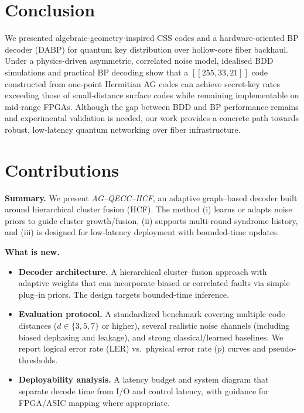 \documentclass[conference]{IEEEtran}
\begin{document}
    \section{Conclusion}

    We presented algebraic‑geometry‑inspired CSS codes and a hardware‑oriented BP decoder (DABP) for quantum key 
distribution over hollow‑core fiber backhaul.  Under a physics‑driven asymmetric, correlated noise model, idealised BDD 
simulations and practical BP decoding show that a $[[255,33,21]]$ code constructed from one‑point Hermitian AG codes can
  achieve secret‑key rates exceeding those of small‑distance surface codes while remaining implementable on mid‑range 
FPGAs.  Although the gap between BDD and BP performance remains and experimental validation is needed, our work provides
  a concrete path towards robust, low‑latency quantum networking over fiber infrastructure.


    \clearpage
    \section{Contributions}
    \label{sec:contributions}
    \noindent\textbf{Summary.} We present \emph{AG--QECC--HCF}, an adaptive graph--based decoder built around 
hierarchical cluster fusion (HCF). The method (i) learns or adapts noise priors to guide cluster growth/fusion, (ii) 
supports multi-round syndrome history, and (iii) is designed for low-latency deployment with bounded-time updates.

    \vspace{0.35em}
    \noindent\textbf{What is new.}
    \begin{itemize}
      \item \textbf{Decoder architecture.} A hierarchical cluster--fusion approach with adaptive weights that can 
incorporate biased or correlated faults via simple plug--in priors. The design targets bounded-time inference.
      \item \textbf{Evaluation protocol.} A standardized benchmark covering multiple code distances ($d\in\{3,5,7\}$ or 
higher), several realistic noise channels (including biased dephasing and leakage), and strong classical/learned 
baselines. We report logical error rate (LER) vs.\ physical error rate ($p$) curves and pseudo-thresholds.
      \item \textbf{Deployability analysis.} A latency budget and system diagram that separate decode time from I/O and 
control latency, with guidance for FPGA/ASIC mapping where appropriate.
    \end{itemize}
\end{document}
